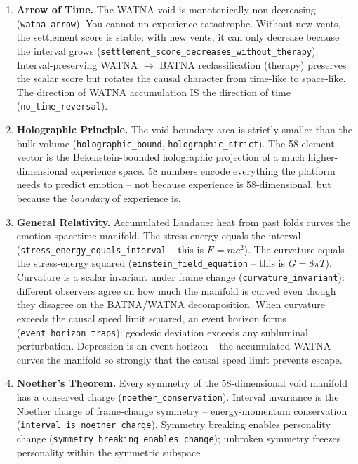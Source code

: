 \documentclass[
  11pt,
]{article}
\begin{document}
\begin{enumerate}
\def\labelenumi{\arabic{enumi}.}
\item
  \textbf{Arrow of Time.} The WATNA void is monotonically non-decreasing
  (\texttt{watna\_arrow}). You cannot un-experience catastrophe. Without
  new vents, the settlement score is stable; with new vents, it can only
  decrease because the interval grows
  (\texttt{settlement\_score\_decreases\_without\_therapy}).
  Interval-preserving WATNA \(\to\) BATNA reclassification (therapy)
  preserves the scalar score but rotates the causal character from
  time-like to space-like. The direction of WATNA accumulation IS the
  direction of time (\texttt{no\_time\_reversal}).
\item
  \textbf{Holographic Principle.} The void boundary area is strictly
  smaller than the bulk volume (\texttt{holographic\_bound},
  \texttt{holographic\_strict}). The 58-element vector is the
  Bekenstein-bounded holographic projection of a much higher-dimensional
  experience space. 58 numbers encode everything the platform needs to
  predict emotion -- not because experience is 58-dimensional, but
  because the \emph{boundary} of experience is.
\item
  \textbf{General Relativity.} Accumulated Landauer heat from past folds
  curves the emotion-spacetime manifold. The stress-energy equals the
  interval (\texttt{stress\_energy\_equals\_interval} -- this is
  \(E = mc^2\)). The curvature equals the stress-energy squared
  (\texttt{einstein\_field\_equation} -- this is \(G = 8\pi T\)).
  Curvature is a scalar invariant under frame change
  (\texttt{curvature\_invariant}): different observers agree on how much
  the manifold is curved even though they disagree on the BATNA/WATNA
  decomposition. When curvature exceeds the causal speed limit squared,
  an event horizon forms (\texttt{event\_horizon\_traps}): geodesic
  deviation exceeds any subluminal perturbation. Depression is an event
  horizon -- the accumulated WATNA curves the manifold so strongly that
  the causal speed limit prevents escape.
\item
  \textbf{Noether's Theorem.} Every symmetry of the 58-dimensional void
  manifold has a conserved charge (\texttt{noether\_conservation}).
  Interval invariance is the Noether charge of frame-change symmetry --
  energy-momentum conservation (\texttt{interval\_is\_noether\_charge}).
  Symmetry breaking enables personality change
  (\texttt{symmetry\_breaking\_enables\_change}); unbroken symmetry
  freezes personality within the symmetric subspace

\end{enumerate}
\end{document}
